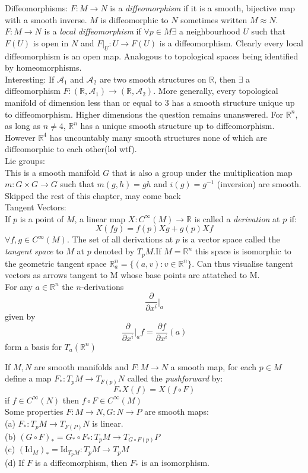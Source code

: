 \documentclass[14pt, twocolumn]{article}
\newcommand{\R}{\mathbb{R}}
\newcommand{\pder}[2]{\frac{\partial#1}{\partial#2}}
\newcommand{\id}[1]{\textrm{Id}_{#1}}
\begin{document}
	Diffeomorphisms:
	$F : M \to N$ is a \textit{diffeomorphism} if it is a smooth, bijective map with a smooth inverse. $M$ is diffeomorphic to $N$ sometimes written $M \approx N$.\\

	$F: M\to N$ is a \textit{local diffeomorphism} if $\forall p \in M \exists$ a neighbourhood $U$ such that $F(U)$ is open in $N$ and $F|_U : U \to F(U)$ is a diffeomorphism. Clearly every local diffeomorphism is an open map. Analogous to topological spaces being identified by homeomorphisms.\\

	Interesting: If $\mathcal{A}_1$ and $\mathcal{A}_2$ are two smooth structures on $\R$, then $\exists$ a diffeomorphism $F:(\R,\mathcal{A}_1) \to (\R,\mathcal{A}_2)$. More generally, every topological manifold of dimension less than or equal to 3 has a smooth structure unique up to diffeomorphism. Higher dimensions the question remains unanswered. For $\R^n$, as long as $n \neq 4$, $\R^n$ has a unique smooth structure up to diffeomorphism. However $\R^4$ has uncountably many smooth structures none of which are diffeomorphic to each other(lol wtf).\\


	Lie groups:\\
	This is a smooth manifold $G$ that is also a group under the multiplication map $m : G \times G \to G$ such that $m(g,h) = gh$ and $i(g) = g^{-1}$ (inversion) are smooth.\\
	Skipped the rest of this chapter, may come back\\

	Tangent Vectors:\\
	If $p$ is a point of $M$, a linear map $X:C^\infty(M) \to \R$ is called a \textit{derivation} at $p$ if:
	$$X(fg) = f(p)Xg + g(p)Xf$$
	$\forall f,g \in C^\infty(M)$. The set of all derivations at $p$ is a vector space called the \textit{tangent space} to $M$ at $p$ denoted by $T_pM$.If $M = \R^n$ this space is isomorphic to the geometric tangent space $\R^n_a = \{(a,v) : v\in \R^n\}$. Can thus visualise tangent vectors as arrows tangent to M whose base points are attatched to M.\\

	For any $a \in \R^n$ the $n$-derivations
	$$\pder{}{x^i}\Big|_a$$
	given by 
	$$\pder{}{x^i}\Big|_a f = \pder{f}{x^i}(a)$$
	form a basis for $T_a(\R^n)$

	If $M , N$ are smooth manifolds and $F:M \to N$ a smooth map, for each $p \in M$ define a map $F_*:T_pM \to T_{F(p)}N$ called the \textit{pushforward} by:
	$$F_*X(f) = X(f \circ F)$$
	if $f \in C^\infty(N)$ then $f\circ F \in C^\infty(M)$\\
	Some properties $F:M \to N, G:N \to P$ are smooth maps:\\
	(a) $F_* : T_pM \to T_{F(P)}N$ is linear.\\
	(b) $(G \circ F)_* = G_* \circ F_* : T_pM \to T_{G\circ F(p)}P$\\
	(c) $(\id{M})_* = \id{T_pM} :T_pM \to T_pM$\\
	(d) If $F$ is a diffeomorphism, then $F_*$ is an isomorphism.\\
\end{document}
